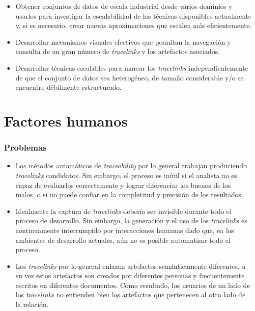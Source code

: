\documentclass[a4paper,12pt,oneside,spanish]{book}
\begin{document}
\begin{itemize}[label={\checkmark}]

\item Obtener conjuntos de datos de escala industrial desde varios dominios y usarlos para investigar la escalabilidad de las técnicas disponibles actualmente y, si es necesario, crear nuevas aproximaciones que escalen más eficientemente.

\item Desarrollar mecanismos visuales efectivos que permitan la navegación y consulta de un gran número de \textit{tracelinks} y los artefactos asociados.

\item Desarrollar técnicas escalables para marcar los \textit{tracelinks} independientemente de que el conjunto de datos sea heterogéneo, de tamaño considerable y/o se encuentre débilmente estructurado.

\end{itemize}


\section{Factores humanos}

\subsubsection{Problemas}

\begin{itemize}[label={$\times$}]

\item Los métodos automáticos de \textit{traceability} por lo general trabajan produciendo \textit{tracelinks} candidatos. Sin embargo, el proceso es inútil si el analista no es capaz de evaluarlos correctamente y lograr diferenciar los buenos de los malos, o si no puede confiar en la completitud y precisión de los resultados.

\item Idealmente la captura de \textit{tracelinks} debería ser invisible durante todo el proceso de desarrollo. Sin embargo, la generación y el uso de los \textit{tracelinks} es continuamente interrumpido por interacciones humanas dado que, en los ambientes de desarrollo actuales, aún no es posible automatizar todo el proceso.

\item Los \textit{tracelinks} por lo general enlazan artefactos semánticamente diferentes, a su vez estos artefactos son creados por diferentes personas y frecuentemente escritos en diferentes documentos. Como resultado, los usuarios de un lado de los \textit{tracelinks} no entienden bien los artefactos que pertenecen al otro lado de la relación.

\end{itemize}
\end{document}
